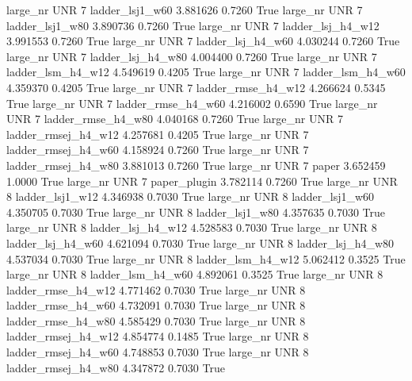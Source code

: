   large_nr      UNR                 7     ladder_lsj1_w60    3.881626      0.7260    True
  large_nr      UNR                 7     ladder_lsj1_w80    3.890736      0.7260    True
  large_nr      UNR                 7   ladder_lsj_h4_w12    3.991553      0.7260    True
  large_nr      UNR                 7   ladder_lsj_h4_w60    4.030244      0.7260    True
  large_nr      UNR                 7   ladder_lsj_h4_w80    4.004400      0.7260    True
  large_nr      UNR                 7   ladder_lsm_h4_w12    4.549619      0.4205    True
  large_nr      UNR                 7   ladder_lsm_h4_w60    4.359370      0.4205    True
  large_nr      UNR                 7  ladder_rmse_h4_w12    4.266624      0.5345    True
  large_nr      UNR                 7  ladder_rmse_h4_w60    4.216002      0.6590    True
  large_nr      UNR                 7  ladder_rmse_h4_w80    4.040168      0.7260    True
  large_nr      UNR                 7 ladder_rmsej_h4_w12    4.257681      0.4205    True
  large_nr      UNR                 7 ladder_rmsej_h4_w60    4.158924      0.7260    True
  large_nr      UNR                 7 ladder_rmsej_h4_w80    3.881013      0.7260    True
  large_nr      UNR                 7               paper    3.652459      1.0000    True
  large_nr      UNR                 7        paper_plugin    3.782114      0.7260    True
  large_nr      UNR                 8     ladder_lsj1_w12    4.346938      0.7030    True
  large_nr      UNR                 8     ladder_lsj1_w60    4.350705      0.7030    True
  large_nr      UNR                 8     ladder_lsj1_w80    4.357635      0.7030    True
  large_nr      UNR                 8   ladder_lsj_h4_w12    4.528583      0.7030    True
  large_nr      UNR                 8   ladder_lsj_h4_w60    4.621094      0.7030    True
  large_nr      UNR                 8   ladder_lsj_h4_w80    4.537034      0.7030    True
  large_nr      UNR                 8   ladder_lsm_h4_w12    5.062412      0.3525    True
  large_nr      UNR                 8   ladder_lsm_h4_w60    4.892061      0.3525    True
  large_nr      UNR                 8  ladder_rmse_h4_w12    4.771462      0.7030    True
  large_nr      UNR                 8  ladder_rmse_h4_w60    4.732091      0.7030    True
  large_nr      UNR                 8  ladder_rmse_h4_w80    4.585429      0.7030    True
  large_nr      UNR                 8 ladder_rmsej_h4_w12    4.854774      0.1485    True
  large_nr      UNR                 8 ladder_rmsej_h4_w60    4.748853      0.7030    True
  large_nr      UNR                 8 ladder_rmsej_h4_w80    4.347872      0.7030    True
